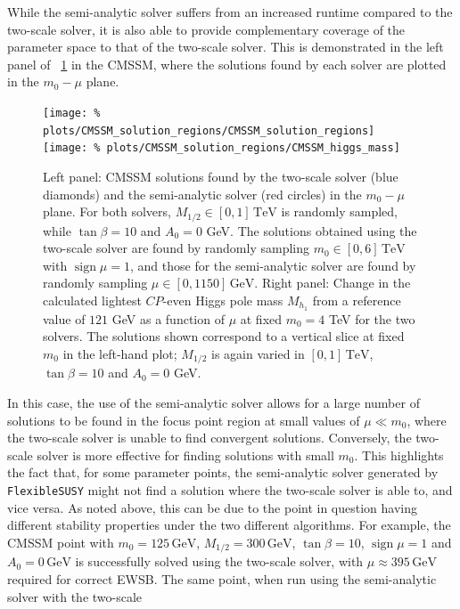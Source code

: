\documentclass[final,3p,11pt,pdflatex]{elsarticle}
\makeatletter
\newcommand{\fs}{\texttt{FlexibleSUSY}\@\xspace}
\newcommand{\unit}[1]{\,\text{#1}}      %
\newcommand{\figref}[1]{\figurename~\ref{#1}}
\newcommand{\CP}{\ensuremath{CP}\xspace}
\newcommand{\azero}{\ensuremath{A_0}\xspace}
\newcommand{\mhalf}{\ensuremath{M_{1/2}}\xspace}
\newcommand{\mzero}{\ensuremath{m_0}\xspace}
\DeclareMathOperator{\sign}{sign}
\makeatother
\begin{document}
While the semi-analytic solver suffers from an increased runtime compared to
the two-scale solver, it is also able to provide complementary coverage of the
parameter space to that of the two-scale solver.  This is demonstrated in the
left panel of \figref{fig:cmssm_solution_regions} in the CMSSM, where the
solutions found by each solver are plotted in the $\mzero - \mu$ plane.
%
\begin{figure}
  \centering
  \texttt{[image: \%
    plots/CMSSM\_solution\_regions/CMSSM\_solution\_regions]}
  \texttt{[image: \%
    plots/CMSSM\_solution\_regions/CMSSM\_higgs\_mass]}
  \caption{Left panel: CMSSM solutions found by the two-scale solver
    (blue diamonds) and the semi-analytic solver (red circles) in the
    $\mzero - \mu$ plane.  For both solvers, $\mhalf \in [0,1]\unit{TeV}$
    is randomly sampled, while $\tan\beta = 10$ and $\azero = 0$ GeV\@.
    The solutions obtained using the two-scale solver are found by
    randomly sampling $\mzero \in [0, 6]\unit{TeV}$ with $\sign \mu = 1$,
    and those for the semi-analytic solver are found by randomly sampling
    $\mu \in [0,1150] \unit{GeV}$.  Right panel: Change in the calculated
    lightest \CP-even Higgs pole mass $M_{h_1}$ from a reference value of
    $121$ GeV as a function of $\mu$ at fixed $\mzero = 4$ TeV for the two
    solvers.  The solutions shown correspond to a vertical slice at fixed
    $\mzero$ in the left-hand plot; $\mhalf$ is again varied in
    $[0,1]\unit{TeV}$, $\tan\beta = 10$ and $\azero = 0$ GeV.}
  \label{fig:cmssm_solution_regions}
\end{figure}
%
In this case, the use of the semi-analytic solver allows for a large number
of solutions to be found in the focus point region \cite{Chan:1997bi,
  Feng:1999hg,Feng:1999mn} at small values of $\mu \ll \mzero$, where the
two-scale solver is unable to find convergent solutions.  Conversely,
the two-scale solver is more effective for finding solutions with small
$\mzero$.  This highlights the fact that, for some parameter points,
the semi-analytic solver generated by \fs might not find a solution
where the two-scale solver is able to, and vice versa.  As noted above, this
can be due to the point in question having different stability properties
under the two different algorithms.  For example, the CMSSM point with
$m_0 = 125\unit{GeV}$, $M_{1/2} = 300\unit{GeV}$, $\tan\beta = 10$,
$\sign \mu = 1$ and $A_0 = 0\unit{GeV}$  is successfully solved using the
two-scale solver, with $\mu \approx 395\unit{GeV}$ required for correct EWSB.
The same point, when run using the semi-analytic solver with the two-scale
\end{document}
